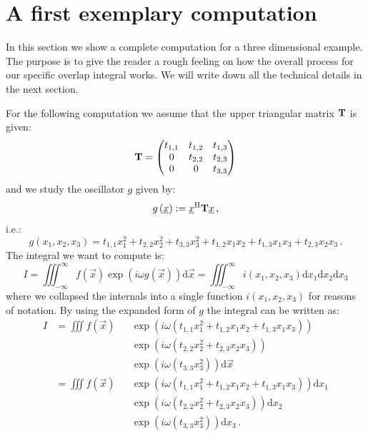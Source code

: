 \documentclass[a4paper,10pt]{article}
\begin{document}
\section{A first exemplary computation}
\label{sec:mv_triag_plain}


In this section we show a complete computation for a three
dimensional example. The purpose is to give the reader a
rough feeling on how the overall process for our specific
overlap integral works. We will write down all the technical
details in the next section.

For the following computation we assume that
the upper triangular matrix $\mathbf{T}$ is given:
\begin{equation}
 \mathbf{T} =
 \begin{pmatrix}
  t_{1,1} & t_{1,2} & t_{1,3} \\
  0       & t_{2,2} & t_{2,3} \\
  0       & 0       & t_{3,3}
 \end{pmatrix}
\end{equation}
and we study the oscillator $g$ given by:
\begin{equation}
 g\left(\underline{x}\right) := \underline{x}{}^{\textnormal{H}} \mathbf{T} \underline{x} \,,
\end{equation}
i.e.:
\begin{equation}
 g\left(x_1, x_2, x_3\right) = t_{1,1} x_1^2 + t_{2,2} x_2^2 + t_{3,3} x_3^2
                             + t_{1,2} x_1 x_2 + t_{1,3} x_1 x_3 + t_{2,3} x_2 x_3 \,.
\end{equation}
The integral we want to compute is:
\begin{equation} \label{eq:mv_original_integral}
  I = \iiint_{-\infty}^{\infty} f\left(\vec{x}\right) \exp\left(i \omega g\left(\vec{x}\right) \right) \mathrm{d}\vec{x}
    = \iiint_{-\infty}^{\infty} i\left(x_1, x_2, x_3\right) \mathrm{d}x_1 \mathrm{d}x_2 \mathrm{d}x_3
\end{equation}
where we collapsed the internals into a single function $i\left(x_1, x_2, x_3\right)$
for reasons of notation. By using the expanded form of $g$ the integral can be written as:
\begin{equation}
\begin{alignedat}{2}
 I & = \iiint f\left(\vec{x}\right)
             & & \exp\left(i \omega \left(t_{1,1} x_1^2 + t_{1,2} x_1 x_2 + t_{1,3} x_1 x_3\right) \right) \\
             & & & \exp\left(i \omega \left(t_{2,2} x_2^2 + t_{2,3} x_2 x_3\right) \right) \\
             & & & \exp\left(i \omega \left(t_{3,3} x_3^2 \right) \right)
       \mathrm{d}\vec{x} \\
   & = \iiint f\left(\vec{x}\right)
             & & \exp\left(i \omega \left(t_{1,1} x_1^2 + t_{1,2} x_1 x_2 + t_{1,3} x_1 x_3\right) \right)
            \mathrm{d}x_1 \\
             & & & \exp\left(i \omega \left(t_{2,2} x_2^2 + t_{2,3} x_2 x_3\right) \right)
            \mathrm{d}x_2 \\
             & & & \exp\left(i \omega \left(t_{3,3} x_3^2 \right) \right)
            \mathrm{d}x_3 \,.
\end{alignedat}
\end{equation}
\end{document}
